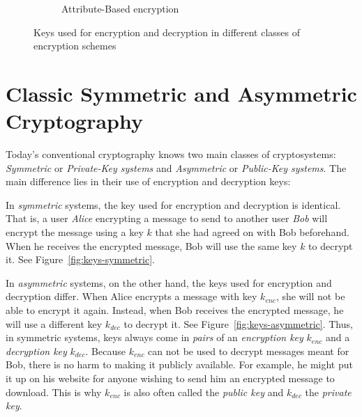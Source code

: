 \begin{figure}
\begin{subfigure}{.7\textwidth}
        \caption{Attribute-Based encryption} \label{fig:keys-abe}
    \end{subfigure}
    \caption{Keys used for encryption and decryption in different classes of encryption schemes}
\end{figure}

\section{Classic Symmetric and Asymmetric Cryptography}
Today's conventional cryptography knows two main classes of cryptosystems: \emph{Symmetric} or \emph{Private-Key systems} and \emph{Asymmetric} or \emph{Public-Key systems}.
The main difference lies in their use of encryption and decryption keys:

In \emph{symmetric} systems, the key used for encryption and decryption is identical.
That is, a user \emph{Alice} encrypting a message to send to another user \emph{Bob} will encrypt the message using a key $k$ that she had agreed on with Bob beforehand.
When he receives the encrypted message, Bob will use the same key $k$ to decrypt it. See Figure~\ref{fig:keys-symmetric}.

In \emph{asymmetric} systems, on the other hand, the keys used for encryption and decryption differ.
When Alice encrypts a message with key $k_{enc}$, she will not be able to encrypt it again.
Instead, when Bob receives the encrypted message, he will use a different key $k_{dec}$ to decrypt it. See Figure~\ref{fig:keys-asymmetric}.
Thus, in symmetric systems, keys always come in \emph{pairs} of an \emph{encryption key} $k_{enc}$ and a \emph{decryption key} $k_{dec}$.
Because $k_{enc}$ can not be used to decrypt messages meant for Bob, there is no harm to making it publicly available.
For example, he might put it up on his website for anyone wishing to send him an encrypted message to download. This is why $k_{enc}$ is also often called the \emph{public key} and $k_{dec}$ the \emph{private key}.

